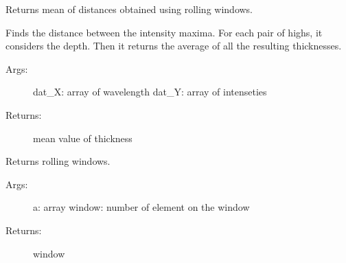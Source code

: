 \documentclass[letterpaper,10pt,english]{sphinxmanual}
\begin{document}

\begin{fulllineitems}
\label{\detokenize{GUI:GUI.rolling_dist}}
Returns mean of distances obtained using rolling windows.

Finds the distance between the intensity maxima. For each pair of highs,
it considers the depth. Then it returns the average of all the resulting 
thicknesses.
\begin{description}
\item[{Args:}] \leavevmode
dat\_X: array of wavelength
dat\_Y: array of intenseties

\item[{Returns:}] \leavevmode
mean value of thickness

\end{description}

\end{fulllineitems}


\begin{fulllineitems}
\label{\detokenize{GUI:GUI.rolling_window}}
Returns rolling windows.
\begin{description}
\item[{Args:}] \leavevmode
a: array
window: number of element on the window

\item[{Returns:}] \leavevmode
window

\end{description}

\end{fulllineitems}

\end{document}
